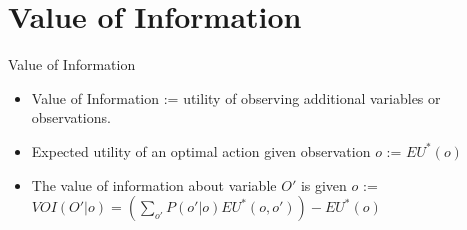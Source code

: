 \documentclass{beamer}
\begin{document}
\section{Value of Information}
\begin{frame}{Value of Information}
\begin{itemize}
    \item Value of Information := utility of observing additional variables or observations.
    \item Expected utility of an optimal action given observation $o$ := $EU^*(o)$
    \item The value of information about variable $O'$ is given $o$ :=
    $VOI(O'|o) = (\sum_{o'} P(o'|o)EU^*(o,o')) - EU^*(o)$ 
\end{itemize}
\end{frame}
\end{document}
